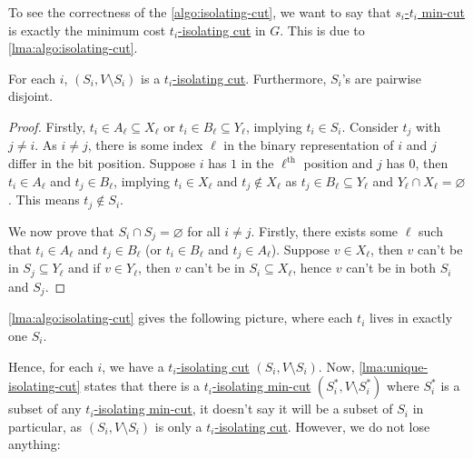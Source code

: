 To see the correctness of the \autoref{algo:isolating-cut}, we want to say that \hyperref[prb:s-t-min-cut]{\(s_i\)-\(t_i\) min-cut} is exactly the minimum cost \hyperref[prb:isolating-cut]{\(t_i\)-isolating cut} in \(G\). This is due to \autoref{lma:algo:isolating-cut}.

\begin{lemma}\label{lma:algo:isolating-cut}
	For each \(i\), \((S_i, V\setminus S_i)\) is a \hyperref[prb:isolating-cut]{\(t_i\)-isolating cut}. Furthermore, \(S_i\)'s are pairwise disjoint.
\end{lemma}
\begin{proof}
	Firstly, \(t_i \in A_{\ell } \subseteq X_{\ell }\) or \(t_i \in B_{\ell } \subseteq Y_{\ell } \), implying \(t_i \in S_i\). Consider \(t_j\) with \(j \neq i\). As \(i \neq j\), there is some index \(\ell \) in the binary representation of \(i\) and \(j\) differ in the bit position. Suppose \(i\) has \(1\) in the \(\ell ^{\text{th} }\) position and \(j\) has \(0\), then \(t_i \in A_{\ell } \) and \(t_j \in B_{\ell } \), implying \(t_i \in X_{\ell } \) and \(t_j \notin X_{\ell } \) as \(t_j \in B_{\ell } \subseteq Y_{\ell } \) and \(Y_{\ell } \cap X_{\ell } = \varnothing \). This means \(t_j \notin S_i\).

	We now prove that \(S_i \cap S_j = \varnothing \) for all \(i \neq j\). Firstly, there exists some \(\ell \) such that \(t_i \in A_{\ell } \) and \(t_j \in B_{\ell } \) (or \(t_i \in B_{\ell } \) and \(t_j \in A_{\ell } \)). Suppose \(v \in X_{\ell } \), then \(v\) can't be in \(S_j \subseteq Y_{\ell } \) and if \(v \in Y_{\ell } \), then \(v\) can't be in \(S_i \subseteq X_{\ell } \), hence \(v\) can't be in both \(S_i\) and \(S_j\).
\end{proof}

\autoref{lma:algo:isolating-cut} gives the following picture, where each \(t_i\) lives in exactly one \(S_i\).

\begin{figure}[H]
	\centering
\end{figure}

Hence, for each \(i\), we have a \hyperref[prb:isolating-cut]{\(t_i\)-isolating cut} \((S_i, V\setminus S_i)\). Now, \autoref{lma:unique-isolating-cut} states that there is a \hyperref[prb:isolating-cut]{\(t_i\)-isolating min-cut} \((S_i^{\ast} , V\setminus S_i^{\ast} )\) where \(S_i^{\ast}\) is a subset of any \hyperref[prb:isolating-cut]{\(t_i\)-isolating min-cut}, it doesn't say it will be a subset of \(S_i\) in particular, as \((S_i, V\setminus S_i)\) is only a \hyperref[prb:isolating-cut]{\(t_i\)-isolating cut}. However, we do not lose anything:

